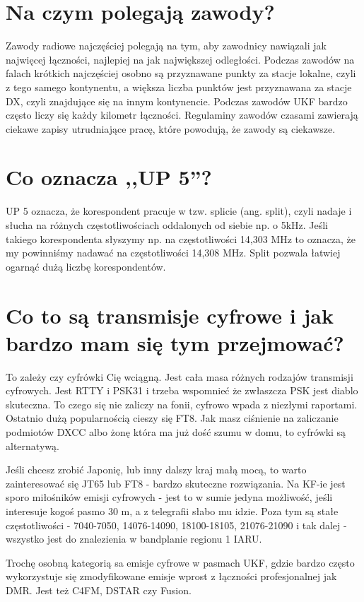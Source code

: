 \documentclass[a4paper,12pt]{article}
\begin{document}
\section{Na czym polegają zawody?}
Zawody radiowe najczęściej polegają na tym, aby zawodnicy nawiązali jak najwięcej łączności, najlepiej na jak największej odległości. Podczas zawodów na falach krótkich najczęściej osobno są przyznawane punkty za stacje lokalne, czyli z tego samego kontynentu, a większa liczba punktów jest przyznawana za stacje DX, czyli znajdujące się na innym kontynencie. Podczas zawodów UKF bardzo często liczy się każdy kilometr łączności. Regulaminy zawodów czasami zawierają ciekawe zapisy utrudniające pracę, które powodują, że zawody są ciekawsze.

\section{Co oznacza ,,UP 5''?}
UP 5 oznacza, że korespondent pracuje w tzw. splicie (ang. split), czyli nadaje i słucha na różnych częstotliwościach oddalonych od siebie np. o 5kHz. Jeśli takiego korespondenta słyszymy np. na częstotliwości 14,303 MHz to oznacza, że my powinniśmy nadawać na częstotliwości 14,308 MHz. Split pozwala łatwiej ogarnąć dużą liczbę korespondentów. 

\section{Co to są transmisje cyfrowe i jak bardzo mam się tym przejmować?}
To zależy czy cyfrówki Cię wciągną. 
Jest cała masa różnych rodzajów transmisji cyfrowych. Jest RTTY i PSK31 i trzeba wspomnieć że zwłaszcza PSK jest diablo skuteczna. To czego się nie zaliczy na fonii, cyfrowo wpada z niezłymi raportami. Ostatnio dużą popularnością cieszy się FT8.
Jak masz ciśnienie na zaliczanie podmiotów DXCC albo żonę która ma już dość szumu w domu, to cyfrówki są alternatywą.

Jeśli chcesz zrobić Japonię, lub inny dalszy kraj małą mocą, to warto zainteresować się JT65 lub FT8 - bardzo skuteczne rozwiązania. Na KF-ie jest sporo miłośników emisji cyfrowych - jest to w sumie jedyna możliwość, jeśli interesuje kogoś pasmo 30 m, a z telegrafii słabo mu idzie. Poza tym są stałe częstotliwości - 7040-7050, 14076-14090, 18100-18105, 21076-21090 i tak dalej - wszystko jest do znalezienia w bandplanie regionu 1 IARU.

Trochę osobną kategorią sa emisje cyfrowe w pasmach UKF, gdzie bardzo często wykorzystuje się zmodyfikowane emisje wprost z łączności profesjonalnej jak DMR. Jest też C4FM, DSTAR czy Fusion.
\end{document}
